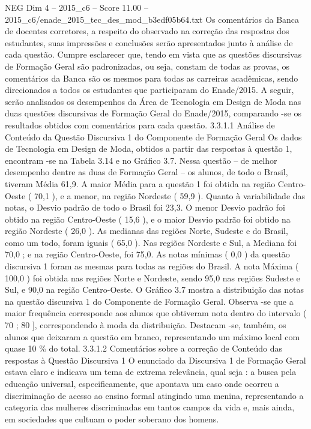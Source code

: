 \begin{textsample}{NEG Dim 4 – 2015\_c6 – Score 11.00 – 2015\_c6/enade\_2015\_tec\_des\_mod\_b3edf05b64.txt}
Os comentários da Banca de docentes corretores, a respeito do observado na correção das respostas dos estudantes, suas impressões e conclusões serão apresentados junto à análise de cada questão.
Cumpre esclarecer que, tendo em vista que as questões discursivas de Formação Geral são padronizadas, ou seja, constam de todas as provas, os comentários da Banca são os mesmos para todas as carreiras acadêmicas, sendo direcionados a todos os estudantes que participaram do Enade/2015.
A seguir, serão analisados os desempenhos da Área de Tecnologia em Design de Moda nas duas questões discursivas de Formação Geral do Enade/2015, comparando -se os resultados obtidos com comentários para cada questão. 3.3.1.1 Análise de Conteúdo da Questão Discursiva 1 do Componente de Formação Geral Os dados de Tecnologia em Design de Moda, obtidos a partir das respostas à questão 1, encontram -se na Tabela 3.14 e no Gráfico 3.7.
Nessa questão – de melhor desempenho dentre as duas de Formação Geral – os alunos, de todo o Brasil, tiveram Média 61,9.
A maior Média para a questão 1 foi obtida na região Centro-Oeste ( 70,1 ), e a menor, na região Nordeste ( 59,9 ).
Quanto à variabilidade das notas, o Desvio padrão de todo o Brasil foi 23,3.
O menor Desvio padrão foi obtido na região Centro-Oeste ( 15,6 ), e o maior Desvio padrão foi obtido na região Nordeste ( 26,0 ).
As medianas das regiões Norte, Sudeste e do Brasil, como um todo, foram iguais ( 65,0 ).
Nas regiões Nordeste e Sul, a Mediana foi 70,0 ; e na região Centro-Oeste, foi 75,0.
As notas mínimas ( 0,0 ) da questão discursiva 1 foram as mesmas para todas as regiões do Brasil.
A nota Máxima ( 100,0 ) foi obtida nas regiões Norte e Nordeste, sendo 95,0 nas regiões Sudeste e Sul, e 90,0 na região Centro-Oeste.
O Gráfico 3.7 mostra a distribuição das notas na questão discursiva 1 do Componente de Formação Geral.
Observa -se que a maior frequência corresponde aos alunos que obtiveram nota dentro do intervalo ( 70 ; 80 ], correspondendo à moda da distribuição.
Destacam -se, também, os alunos que deixaram a questão em branco, representando um máximo local com quase 10 \% do total. 3.3.1.2 Comentários sobre a correção de Conteúdo das respostas à Questão Discursiva 1 O enunciado da Discursiva 1 de Formação Geral estava claro e indicava um tema de extrema relevância, qual seja : a busca pela educação universal, especificamente, que apontava um caso onde ocorreu a discriminação de acesso ao ensino formal atingindo uma menina, representando a categoria das mulheres discriminadas em tantos campos da vida e, mais ainda, em sociedades que cultuam o poder soberano dos homens.

\end{textsample}
